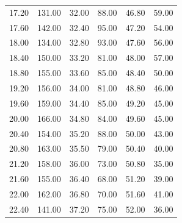 \begin{table}
\begin{tabular}{c c | c c | c c}
    17.20 & 131.00 & 32.00 & 88.00 & 46.80 & 59.00 \\
    17.60 & 142.00 & 32.40 & 95.00 & 47.20 & 54.00 \\
    18.00 & 134.00 & 32.80 & 93.00 & 47.60 & 56.00 \\
    18.40 & 150.00 & 33.20 & 81.00 & 48.00 & 57.00 \\
    18.80 & 155.00 & 33.60 & 85.00 & 48.40 & 50.00 \\
    19.20 & 156.00 & 34.00 & 81.00 & 48.80 & 46.00 \\
    19.60 & 159.00 & 34.40 & 85.00 & 49.20 & 45.00 \\
    20.00 & 166.00 & 34.80 & 84.00 & 49.60 & 45.00 \\
    20.40 & 154.00 & 35.20 & 88.00 & 50.00 & 43.00 \\
    20.80 & 163.00 & 35.50 & 79.00 & 50.40 & 40.00 \\
    21.20 & 158.00 & 36.00 & 73.00 & 50.80 & 35.00 \\
    21.60 & 155.00 & 36.40 & 68.00 & 51.20 & 39.00 \\
    22.00 & 162.00 & 36.80 & 70.00 & 51.60 & 41.00 \\
    22.40 & 141.00 & 37.20 & 75.00 & 52.00 & 36.00 \\
    \bottomrule
  \end{tabular} %
\end{table}

\newpage


